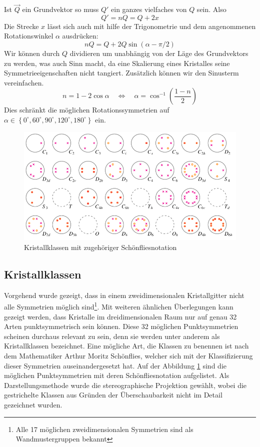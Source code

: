  Ist \(\vec{Q}\) ein Grundvektor so muss \(Q'\) ein ganzes vielfaches von \(Q\) sein.
 Also
 \[
    Q' = nQ = Q + 2x
 \]
 Die Strecke \(x\) lässt sich auch mit hilfe der Trigonometrie und dem angenommenen Rotationswinkel \(\alpha\) ausdrücken:
 \[
    nQ = Q + 2Q\sin(\alpha - \pi/2)
 \]
 Wir können durch \(Q\) dividieren um unabhängig von der Läge des Grundvektors zu werden, was auch Sinn macht, da eine Skalierung eines Kristalles seine Symmetrieeigenschaften nicht tangiert.
 Zusätzlich können wir den Sinusterm vereinfachen.
 \[
     n = 1 - 2\cos\alpha \quad\iff\quad
     \alpha = \cos^{-1}\left(\frac{1-n}{2}\right)
 \]
 Dies schränkt die möglichen Rotationssymmetrien auf 
 \(
     \alpha \in \left\{ 0^\circ, 60^\circ, 90^\circ, 120^\circ, 180^\circ\right\}
 \)
ein.

\begin{figure}
    \centering
    \includegraphics[]{papers/punktgruppen/figures/projections}
    \caption{Kristallklassen mit zugehöriger Schönfliesnotation}
    \label{fig:punktgruppen:Kristallkassen}
\end{figure}

\subsection{Kristallklassen}
Vorgehend wurde gezeigt, dass in einem zweidimensionalen Kristallgitter nicht alle Symmetrien möglich sind\footnote{Alle 17 möglichen zweidimensionalen Symmetrien sind als Wandmustergruppen bekannt}.
Mit weiteren ähnlichen \"Uberlegungen kann gezeigt werden, dass Kristalle im dreidimensionalen Raum nur auf genau 32 Arten punktsymmetrisch sein können.
Diese 32 möglichen Punktsymmetrien scheinen durchaus relevant zu sein, denn sie werden unter anderem als Kristallklassen bezeichnet.
Eine mögliche Art, die Klassen zu benennen ist nach dem Mathematiker Arthur Moritz Schönflies, welcher sich mit der Klassifizierung dieser Symmetrien auseinandergesetzt hat.
Auf der Abbildung \ref{fig:punktgruppen:Kristallkassen} sind die möglichen Punktsymmetrien mit deren Schönfliesnotation aufgelistet.
Als Darstellungsmethode wurde die stereographische Projektion gewählt, wobei die gestrichelte Klassen aus Gründen der Überschaubarkeit nicht im Detail gezeichnet wurden.


